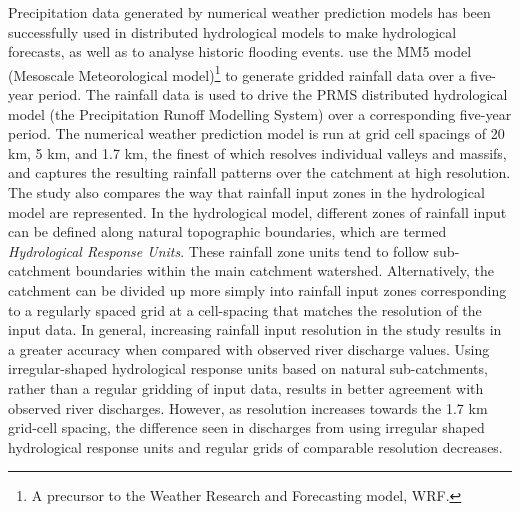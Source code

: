 Precipitation data generated by numerical weather prediction models has been successfully used in distributed hydrological models to make hydrological forecasts, as well as to analyse historic flooding events. \citet{hay2006one} use the MM5 model (Mesoscale Meteorological model)\footnote{A precursor to the Weather Research and Forecasting model, WRF.} to generate gridded rainfall data over a five-year period. The rainfall data is used to drive the PRMS distributed hydrological model (the Precipitation Runoff Modelling System) over a corresponding five-year period. The numerical weather prediction model is run at grid cell spacings of 20 km, 5 km, and 1.7 km, the finest of which resolves individual valleys and massifs, and captures the resulting rainfall patterns over the catchment at high resolution. The study also compares the way that rainfall input zones in the hydrological model are represented. In the hydrological model, different zones of rainfall input can be defined along natural topographic boundaries, which are termed \textit{Hydrological Response Units}. These rainfall zone units tend to follow sub-catchment boundaries within the main catchment watershed. Alternatively, the catchment can be divided up more simply into rainfall input zones corresponding to a regularly spaced grid at a cell-spacing that matches the resolution of the input data.
In general, increasing rainfall input resolution in the \citet{hay2006one} study results in a greater accuracy when compared with observed river discharge values. Using irregular-shaped hydrological response units based on natural sub-catchments, rather than a regular gridding of input data, results in better agreement with observed river discharges. However, as resolution increases towards the 1.7 km grid-cell spacing, the difference seen in discharges from using irregular shaped hydrological response units and regular grids of comparable resolution decreases. 

